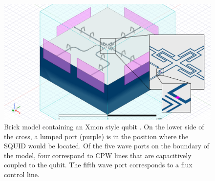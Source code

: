 \begin{figure}[!h]
    \centering
    \includegraphics[width=\textwidth]{figures/xmon_extra_zoom.png}
    \caption{Brick model containing an Xmon style qubit \cite{xmon}. On the lower side of the cross, a lumped port (purple) is in the position where the SQUID would be located. Of the five wave ports on the boundary of the model, four correspond to CPW lines that are capacitively coupled to the qubit. The fifth wave port corresponds to a flux control line.}
    \label{fig:xmon_brick}
\end{figure}


